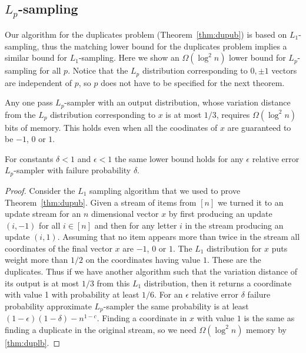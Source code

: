 \subsection{$L_p$-sampling}
Our algorithm for the duplicates problem (Theorem~\ref{thm:dupub}) is based on
$L_1$-sampling, thus the matching lower bound for the duplicates problem
implies a similar bound for $L_1$-sampling. Here we show an $\Omega(\log^2 n)$ lower bound for $L_p$-sampling for all $p$.
 Notice that the $L_p$ distribution corresponding to $0,\pm1$
vectors are independent of $p$, so $p$ does not have to be specified for the
next theorem.

\begin{theorem}\label{lpl}
Any one pass
$L_p$-sampler with an output distribution,
whose variation distance from the $L_p$ distribution corresponding to $x$ is
at most $1/3$, requires $\Omega(\log^2n)$ bits of memory. This holds even
when all the coodinates of $x$
are
guaranteed to be $-1$, $0$ or $1$.

For constants $\delta<1$ and $\epsilon<1$ the same lower bound holds for any
$\epsilon$ relative error $L_p$-sampler with failure probability $\delta$.
\end{theorem}

\begin{proof}
Consider the $L_1$ sampling algorithm that we used to prove
Theorem~\ref{thm:dupub}. Given a stream of items from $[n]$ we turned it to
an update stream for an $n$ dimensional vector $x$ by first
producing an update $(i,-1)$ for all $i\in[n]$ and then for any letter $i$ in
the stream producing an update $(i,1)$. Assuming that no item appears more
than twice in the stream all coordinates of the final vector $x$ are $-1$, $0$
or $1$. The $L_1$ distribution for $x$ puts weight more than $1/2$ on the
coordinates having value $1$. These are the duplicates. Thus if we have
another algorithm such that the variation distance of its output is at most
$1/3$ from this $L_1$ distribution, then it returns a coordinate with value 1
with probability at least $1/6$. For an $\epsilon$ relative error $\delta$
failure probability approximate $L_p$-sampler the same probability is at least
$(1-\epsilon)(1-\delta)-n^{1-c}$. Finding a coordinate in $x$ with value $1$
is the same as finding a duplicate in the original stream, so we need
$\Omega(\log^2n)$ memory by \autoref{thm:duplb}.
\end{proof}



